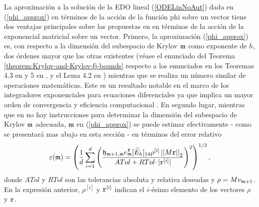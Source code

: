 La aproximación a la solución de la EDO lineal (\ref{ODELinNoAut}) dada en (\ref{phi_approx}) en términos de la acción de la función phi sobre un vector tiene dos ventajas principales sobre las propuestas en \cite{hochbruck1997krylov,sidje1998expokit,jimenez2012convergence}
en términos de la acción de la exponencial matricial sobre un vector. Primero, la aproximación (\ref{phi_approx}) es, con respecto a la dimensión del subespacio de Krylov $\mathfrak{m}$ como exponente de $h$, dos órdenes mayor que las otras existentes (véase el enunciado del Teorema \ref{theorem:Krylov-and-Krylov-fj-bounds} respecto a los enunciados en los Teoremas 4.3 en \cite{Saad92} y 5 en \cite{hochbruck1997krylov}, y el Lema 4.2 en \cite{jimenez2012convergence}) mientras que se realiza un número similar de operaciones matemáticas. Este es un resultado notable en el marco de los integradores exponenciales para ecuaciones diferenciales ya que implica un mayor orden de convergencia y eficiencia computacional \cite{naranjo2021locally}. En segundo lugar, mientras que en \cite{hochbruck1997krylov,sidje1998expokit,jimenez2012convergence} no hay instrucciones para determinar la dimensión del subespacio de Krylov $\mathfrak{m}$ adecuada, $\mathfrak{m}$ en (\ref{phi_approx}) se puede estimar efectivamente - como se presentará mas abajo en esta sección - en términos del error relativo \cite{naranjo2021locally,naranjo2023computing}
\begin{equation}
\varepsilon(\mathfrak{m}) = \left(\frac{1}{d}\sum\limits_{i=1}^{d} \left(\frac{
	\mathfrak{h}_{\mathfrak{m}+1,\mathfrak{m}} e_{\mathfrak{m}}^\intercal
	[\widetilde{E}_h]_{14} \rho^{[i]} \left\lvert \left\lvert M\mathtt{r} \right\rvert \right\rvert_2}{ATol+ RTol\cdotp
	\rvert \mathtt{r}^{[i]}\rvert}\right)^{2}\right)^{1/2}, \label{eq:def-rel-error}
\end{equation}
donde $ATol$ y $RTol$ son las tolerancias absoluta y relativa deseadas y $\rho = M v_{\mathfrak{m}+1}$. En la expresión anterior, $\rho^{[i]}$ y $\mathtt{r}^{[i]}$ indican el $i$-ésimo elemento de los vectores $\rho$ y $\mathtt{r}$.

